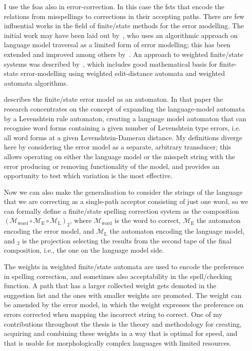 \documentclass[officiallayout]{unihelcompling}
\begin{document}
I use the \glspl{fsa} also in error-correction. In this case the
\glspl{fst} that encode the relations from
misspellings to corrections in their accepting paths. There are few influential
works in the field of finite\-/state methods for the error modelling. The
initial work may have been laid out by~\citet{oflazer1996errortolerant}, who
uses an algorithmic approach on language model traversal as a limited form of
error modelling; this has been extended and improved among others
by~\citet{hulden2009fast}.  An approach to weighted finite\-/state systems was
described by~\citet{mohri2003edit}, which includes good mathematical basis for
finite-state error-modelling using weighted edit-distance automata and weighted
automata algorithms. 

\citet{agata2002typographical} describes the finite\-/state error model
as an automaton. In that paper the research concentrates on the
concept of expanding the language-model automata by a Levenshtein rule
automaton, creating a language model automaton that can recognise word forms
containing a given number of Levenshtein type errors, i.e. all word forms at a
given Levenshtein-Damerau distance. My definitions diverge here by considering
the error model as a separate, arbitrary transducer; this allows
operating on either the language model or the misspelt string with the error
producing or removing functionality of the model, and provides an opportunity
to test which variation is the most effective. 

Now we can also make the generalisation to consider the strings of the language
that we are correcting as a single-path acceptor consisting of just one word,
so we can formally define a finite\-/state spelling correction
system as the composition $(\mathcal{M}_\mathrm{word} \circ
\mathcal{M}_\mathrm{E} \circ \mathcal{M}_\mathrm{L})_2$, where
$\mathcal{M}_\mathrm{word}$ is the word to correct, $\mathcal{M}_\mathrm{E}$
the automaton encoding the error model, and $\mathcal{M}_\mathrm{L}$ the
automaton encoding the language model, and $_2$ is the projection selecting the
results from the second tape of the final composition, i.e., the one on the
language model side.

The weights in weighted finite\-/state automata are used to encode the
preference in spelling correction, and sometimes also acceptability in the
spell\-/checking function. A path that has a larger collected weight gets
demoted in the suggestion list and the ones with smaller weights are promoted.
The weight can be amended by the error model, in which the weight expresses the
preference on errors corrected when mapping the incorrect string to correct.
One of my contributions throughout the thesis is the theory and methodology for
creating, acquiring and combining these weights in a way that is optimal for
speed, and that is usable for morphologically complex languages with limited
resources.
\end{document}
